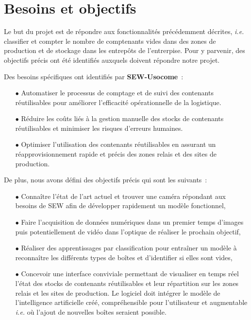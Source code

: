 \section{Besoins et objectifs}

Le but du projet est de répondre aux fonctionnalités précédemment
décrites, \textit{i.e.} classifier et compter le nombre de comptenants
vides dans des zones de production et de stockage dans les entrepôts
de l'entrerpise. Pour y parvenir, des objectifs précis ont été
identifiés auxquels doivent répondre notre projet.

Des besoins spécifiques ont identifiés par \textbf{SEW-Usocome}~:\\

\begin{itemize}
\item[$\bullet$] Automatiser le processus de comptage et de suivi des
  contenants réutilisables pour améliorer l'efficacité opérationnelle
  de la logistique.
\item[$\bullet$] Réduire les coûts liés à la gestion manuelle des
  stocks de contenants réutilisables et minimiser les risques
  d'erreurs humaines.
\item[$\bullet$] Optimiser l'utilisation des contenants réutilisables
  en assurant un réapprovisionnement rapide et précis des zones relais
  et des sites de production.\\
\end{itemize}%

De plus, nous avons défini des objectifs précis qui sont les suivants~:\\

\begin{itemize}
 \item[$\bullet$] Connaître l'état de l'art actuel et trouver une
caméra répondant aux besoins de SEW afin de développer rapidement un
modèle fonctionnel,
\item[$\bullet$] Faire l'acquisition de données numériques dans un
premier temps d'images puis potentiellement de vidéo dans l'optique de
réaliser le prochain objectif,
\item[$\bullet$] Réaliser des apprentissages par classification pour
entraîner un modèle à reconnaître les différents types de boîtes et
d'identifier si elles sont vides,
\item[$\bullet$] Concevoir une interface conviviale permettant de
visualiser en temps réel l'état des stocks de contenants réutilisables
et leur répartition sur les zones relais et les sites de
production. Le logiciel doit intégrer le modèle de l'intelligence
artificielle créé, compréhensible pour l'utilisateur et augmentable
\textit{i.e.} où l'ajout de nouvelles boîtes seraient possible.
\end{itemize}

